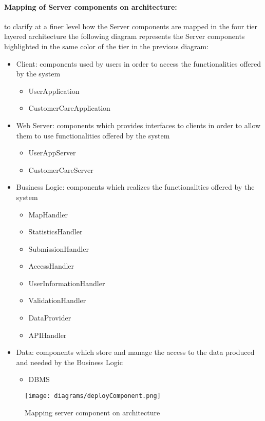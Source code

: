 \paragraph{Mapping of Server components on architecture:}to clarify at a finer level how the Server components are mapped in the four tier layered architecture the following diagram represents the Server components highlighted in the same color of the tier in the previous diagram:
\begin{itemize}
	\item Client: components used by users in order to access the functionalities offered by the system
		\begin{itemize}
			\item UserApplication
			\item CustomerCareApplication
		\end{itemize}
	\item Web Server: components which provides interfaces to clients in order to allow them to use functionalities offered by the system
		\begin{itemize}
			\item UserAppServer
			\item CustomerCareServer
		\end{itemize}
	\item Business Logic: components which realizes the functionalities offered by the system
		\begin{itemize}
			\item MapHandler
			\item StatisticsHandler
			\item SubmissionHandler
			\item AccessHandler
			\item UserInformationHandler
			\item ValidationHandler
			\item DataProvider
			\item APIHandler
		\end{itemize}
	\item Data: components which store and manage the access to the data produced and needed by the Business Logic
		\begin{itemize}
			\item DBMS
		\end{itemize}
\end{itemize}

\begin{figure}[h]
			\centering
			\texttt{[image: diagrams/deployComponent.png]}
			\caption{
				\label{fig:deployServerComponent} 
				Mapping server component on architecture
			}
		\end{figure}
\clearpage

